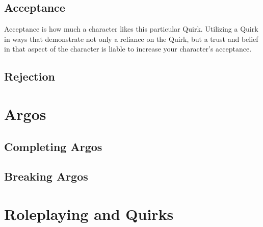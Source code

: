 \documentclass[../main.tex]{subfiles}
\begin{document}
    \subsection{Acceptance}

    Acceptance is how much a character likes this particular Quirk. Utilizing a Quirk in ways that demonstrate not only a reliance on the Quirk, but a trust and belief in that aspect of the character is liable to increase your character's acceptance. 

    
    \subsection{Rejection}



    \section{Argos}

    \subsection{Completing Argos}

    \subsection{Breaking Argos}

    \section{Roleplaying and Quirks}
\end{document}
